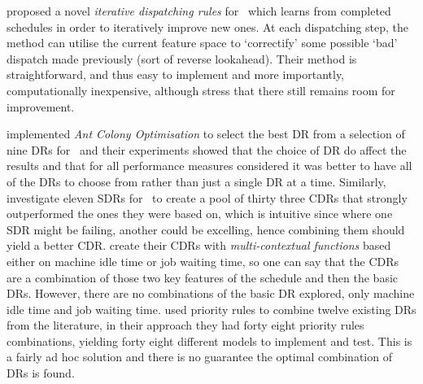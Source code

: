 \citet{Nguyen13} proposed a novel \textit{iterative dispatching rules} for \JSP\ which learns from completed schedules in order to iteratively improve new ones. At each dispatching step, the method can utilise the current feature space to `correctify' some possible `bad' dispatch made previously (sort of reverse lookahead).
Their method is straightforward, and thus easy to implement and more importantly, computationally inexpensive, although \citeauthor{Nguyen13} stress that there still remains room for improvement. 

\citet{Korytkowski13} implemented \textit{Ant Colony Optimisation} to select the best DR from a selection of nine DRs for \JSP\ and their experiments showed that the choice of DR do affect the results and that for all performance measures considered it was better to have all of the DRs to choose from rather than just a single DR at a time. 
Similarly, \citet{Lu13} investigate eleven SDRs for \JSP\ to create a pool of thirty three CDRs that strongly outperformed the ones they were based on, which is intuitive since where one SDR might be failing, another could be excelling, hence combining them should yield a better CDR. \citeauthor{Lu13} create their CDRs with \textit{multi-contextual functions} based either on machine idle time or job waiting time, so one can say that the CDRs are a combination of those two key features of the schedule and then the basic DRs. However, there are no combinations of the basic DR explored, only machine idle time and job waiting time.  
\citet{Yu13} used priority rules to combine twelve existing DRs from the literature, in their approach they had forty eight priority rules combinations, yielding forty eight different models to implement and test. This is a fairly ad hoc solution and there is no guarantee the optimal combination of DRs is found. 

\clearpage
